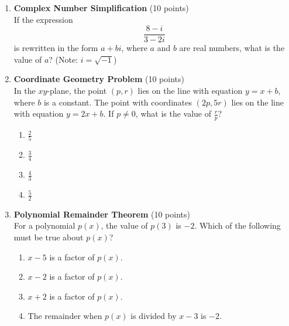 \begin{enumerate}
  \item \textbf{Complex Number Simplification} (10 points)\\
  If the expression
  \[
  \frac{8-i}{3-2 i}
  \]
  is rewritten in the form $a+b i$, where $a$ and $b$ are real numbers, what is the value of $a$? (Note: $i=\sqrt{-1}$)
  \begin{subanswer}
  \end{subanswer}



  \item \textbf{Coordinate Geometry Problem} (10 points)\\
  In the $xy$-plane, the point $(p, r)$ lies on the line with equation $y = x + b$, 
  where $b$ is a constant. The point with coordinates $(2p, 5r)$ lies on the line 
  with equation $y = 2x + b$. If $p \neq 0$, what is the value of $\frac{r}{p}$?
  \begin{enumerate}[label=(\Alph*)]
    \item $\frac{2}{5}$
    \item $\frac{3}{4}$
    \item $\frac{4}{3}$
    \item $\frac{5}{2}$
  \end{enumerate}
  \begin{subanswer}
  \end{subanswer}

  \item \textbf{Polynomial Remainder Theorem} (10 points)\\
  For a polynomial $p(x)$, the value of $p(3)$ is $-2$. Which of the following must be true about $p(x)$?
  \begin{enumerate}[label=(\Alph*)]
    \item $x-5$ is a factor of $p(x)$.
    \item $x-2$ is a factor of $p(x)$.
    \item $x+2$ is a factor of $p(x)$.
    \item The remainder when $p(x)$ is divided by $x-3$ is $-2$.
  \end{enumerate}
  \begin{subanswer}
  \end{subanswer}

\end{enumerate}
